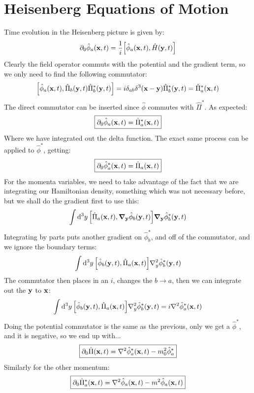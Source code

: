 \documentclass[12pt]{article}
\newcommand{\D}{\partial}
\newcommand{\phih}{\hat{\phi}}
\newcommand{\phish}{\hat{\phi}^*}
\newcommand{\pih}{\hat{\Pi}}
\newcommand{\pish}{\hat{\Pi}^*}
\begin{document}
\section{Heisenberg Equations of Motion}
Time evolution in the Heisenberg picture is given by:
\begin{align*}
  \D_0\phih_a(\vb{x},t)=\frac{1}{i}\comm{\phih_a(\vb{x},t)}{\hat{H}(\vb{y},t)}
\end{align*}
Clearly the field operator commuts with the potential and the gradient term, so we only need to find the following commutator:
\begin{align*}
  \comm{\phih_a(\vb{x},t)}{\pih_b(\vb{y},t)\pish_b(\vb{y},t)}=
  i\delta_{ab}\delta^3(\vb{x}-\vb{y})\pish_b(\vb{y},t)=\pish_a(\vb{x},t)
\end{align*}
The direct commutator can be inserted since $\phih$ commutes with $\pish$. As expected:
\begin{align*}
  \boxed{\D_0\phih_a(\vb{x},t)=\pish_a(\vb{x},t)}
\end{align*}
Where we have integrated out the delta function. The exact same process can be applied to $\phish$, getting:
\begin{align*}
  \boxed{\D_0\phish_a(\vb{x},t)=\pih_a(\vb{x},t)}
\end{align*}
For the momenta variables, we need to take advantage of the fact that we are integrating our Hamiltonian density, something which was not necessary before, but we shall do the gradient first to use this:
\begin{align*}
  \int\dd[3]{y}\comm{\pih_a(\vb{x},t)}{\grad_{\vb{y}}{\phih_b(\vb{y},t)}}
  \grad_{\vb{y}}\phish_b(\vb{y},t)
\end{align*}
Integrating by parts puts another gradient on $\phish_b$, and off of the commutator, and we ignore the boundary terms:
\begin{align*}
  \int\dd[3]{y}\comm{\phih_b(\vb{y},t)}{\pih_a(\vb{x},t)}
  \laplacian_y{\phish_b(\vb{y},t)}
\end{align*}
The commutator then places in an $i$, changes the $b\to a$, then we can integrate out the $\vb{y}$ to $\vb{x}$:
\begin{align*}
  \int\dd[3]{y}\comm{\phih_b(\vb{y},t)}{\pih_a(\vb{x},t)}
  \laplacian_y{\phish_b(\vb{y},t)}=i\laplacian{\phish_a(\vb{x},t)}
\end{align*}
Doing the potential commutator is the same as the previous, only we get a $\phish$, and it is negative, so we end up with...
\begin{align*}
  \boxed{\D_0\pih(\vb{x},t)=\laplacian{\phish_a(\vb{x},t)}-m_0^2\phish_a}
\end{align*}
Similarly for the other momentum:
\begin{align*}
  \boxed{\D_0\pish_a(\vb{x},t)=
    \laplacian{\phih_a(\vb{x},t)}-m^2\phih_a(\vb{x},t)}
\end{align*}
\end{document}
